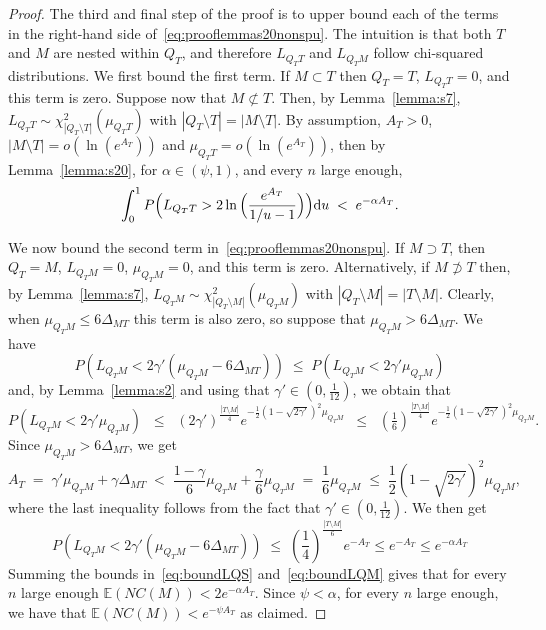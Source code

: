 \documentclass[
  12pt]{article}
\newcommand{\E}{\mathbb{E}}
\begin{document}
\begin{proof}
The third and final step of the proof is to upper bound each of the terms in the right-hand side of~\eqref{eq:prooflemmas20nonspu}. The intuition is that both $T$ and $M$ are nested within $Q_T$, and therefore $L_{Q_T T}$ and $L_{Q_T M}$ follow chi-squared distributions.
We first bound the first term. %
If $M \subset T$ then $Q_T=T$, $L_{Q_TT}=0$, and this term is zero. Suppose now that $M \not\subset T$. %
Then, by Lemma~\ref{lemma:s7}, %
$L_{Q_TT} \sim \mathcal{\chi}_{|Q_T\setminus T|}^2(\mu_{Q_TT})$ with $|Q_T\setminus T|=|M\setminus T|$. By assumption, $A_T>0$, $|M\setminus T|=o(\ln(e^{A_T}))$ and $\mu_{Q_TT}=o(\ln(e^{A_T}))$, then  by Lemma~\ref{lemma:s20}, for $\alpha\in(\psi,1)$, and every $n$ large enough,
\begin{equation}\label{eq:boundLQS}
\int_0^1P\Bigl(L_{Q_TT}>2\ln{\Bigl(\frac{e^{A_T}}{1 / u-1}\Bigl)}\Bigl){\rm d}u \;<\; 
e^{-\alpha A_T}.
\end{equation}

We now bound the second term in~\eqref{eq:prooflemmas20nonspu}. If $M \supset T$, then $Q_T=M$, $L_{Q_TM}=0$, $\mu_{Q_TM}=0$, and this term is zero. Alternatively, if $M \not\supset T$ %
then, by Lemma~\ref{lemma:s7}, $L_{Q_TM} \sim \chi_{|Q_T\setminus M|}^2(\mu_{Q_TM})$ with $|Q_T\setminus M|=|T\setminus M|$.
Clearly, when $\mu_{Q_TM}\leq 6\Delta_{MT}$ this term is also zero, so suppose that $\mu_{Q_TM}> 6\Delta_{MT}$.  
We have  
$$P\left(L_{Q_TM}<2\gamma'(\mu_{Q_TM}-6\Delta_{MT})\right)\; \leq \; P\left(L_{Q_TM}<2\gamma'\mu_{Q_TM}\right)$$ 
and, by Lemma~\ref{lemma:s2} and using that $\gamma'\in (0,\tfrac{1}{12})$, we obtain that 
$$P\left(L_{Q_TM}<2\gamma'\mu_{Q_TM}\right) \;\;\leq\;\; (2\gamma')^{\frac{|T\setminus M|}{4}} e^{-\frac{1}{2}(1-\sqrt{2\gamma'})^2\mu_{Q_TM}}\;\;\leq\;\;  (\tfrac16)^{\frac{|T\setminus M|}{4}}e^{-\frac{1}{2}(1-\sqrt{2\gamma'})^2\mu_{Q_TM}}.$$
Since $\mu_{Q_TM}>6\Delta_{MT}$, we get
$$
A_T\;=\;\gamma'\mu_{Q_TM}+\gamma\Delta_{MT}\;<\;\frac{1-\gamma}{6}\mu_{Q_TM}+\frac{\gamma}{6}\mu_{Q_TM}\;=\;\frac16\mu_{Q_TM}\;\leq\;\frac12(1-\sqrt{2\gamma'})^2\mu_{Q_TM},
$$
where the last inequality follows from the fact that $\gamma'\in(0, \tfrac{1}{12})$. We then get
\begin{equation}\label{eq:boundLQM}
    P\left(L_{Q_TM}<2\gamma'(\mu_{Q_TM}-6\Delta_{MT})\right) \;\leq\; \left(\frac14\right)^{\frac{|T\setminus M|}{6}}e^{-A_T} \leq e^{-A_T}\leq e^{-\alpha A_T}
\end{equation}
Summing the bounds in~\eqref{eq:boundLQS} and~\eqref{eq:boundLQM} gives that for every $n$ large enough $\E\left(NC(M)\right) < 2e^{-\alpha A_T}$. Since $\psi<\alpha$, for every $n$ large enough, we have that $\E\left(NC(M)\right) < e^{-\psi A_T}$ as claimed.
\end{proof}
\end{document}
